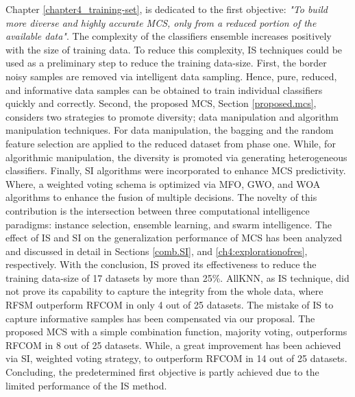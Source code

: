 Chapter \ref{chapter4_training-set}, is dedicated to the first objective: \textit{"To build more diverse and highly accurate MCS, only from a reduced portion of the available data"}. The complexity of the classifiers ensemble increases positively with the size of training data. To reduce this complexity, IS techniques could be used as a preliminary step to reduce the training data-size. First, the border noisy samples are removed via intelligent data sampling. Hence, pure, reduced, and informative data samples can be obtained to train individual classifiers quickly and correctly. Second, the proposed MCS, Section \ref{proposed.mcs}, considers two strategies to promote diversity; data manipulation and algorithm manipulation techniques. For data manipulation, the bagging and the random feature selection are applied to the reduced dataset from phase one. While, for algorithmic manipulation, the diversity is promoted via generating heterogeneous classifiers. Finally, SI algorithms were incorporated to enhance MCS predictivity. Where, a weighted voting schema is optimized via MFO, GWO, and WOA algorithms to enhance the fusion of multiple decisions. The novelty of this contribution is the intersection between three computational intelligence paradigms: instance selection, ensemble learning, and swarm intelligence. The effect of IS and SI on the generalization performance of MCS has been analyzed and discussed in detail in Sections \ref{comb.SI}, and \ref{ch4:explorationofres}, respectively. With the conclusion, IS proved its effectiveness to reduce the training data-size of 17 datasets by more than 25\%. AllKNN, as IS technique, did not prove its capability to capture the integrity from the whole data, where RFSM outperform RFCOM in only 4 out of 25 datasets. The mistake of IS to capture informative samples has been compensated via our proposal. The proposed MCS with a simple combination function, majority voting, outperforms RFCOM in 8 out of 25 datasets. While, a great improvement has been achieved via SI, weighted voting strategy, to outperform RFCOM in 14 out of 25 datasets. Concluding, the predetermined first objective is partly achieved due to the limited performance of the IS method. 

